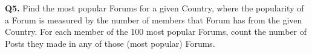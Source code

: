 \textbf{Q5.}
Find the most popular Forums for a given Country, where the popularity
of a Forum is measured by the number of members that Forum has from the
given Country.
For each member of the 100 most popular Forums, count the number of
Posts they made in any of those (most popular) Forums.
